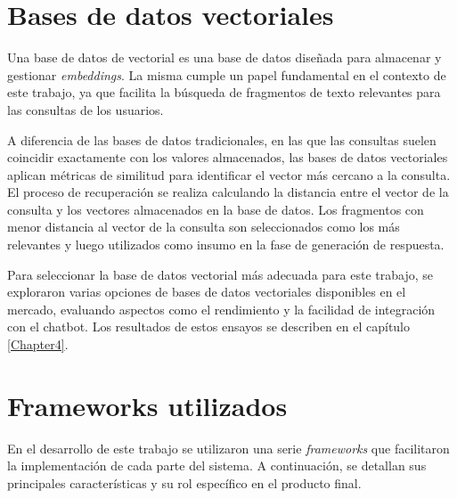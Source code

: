\section{Bases de datos vectoriales}

Una base de datos de vectorial es una base de datos diseñada para almacenar y gestionar \textit{embeddings}. La misma
cumple un papel fundamental en el contexto de este trabajo, ya que facilita la búsqueda de fragmentos de texto 
relevantes para las consultas de los usuarios.

A diferencia de las bases de datos tradicionales, en las que las consultas suelen coincidir exactamente con los valores almacenados, 
las bases de datos vectoriales aplican métricas de similitud para identificar el vector más cercano a la consulta. 
El proceso de recuperación se realiza calculando la distancia entre 
el vector de la consulta y los vectores almacenados en la base de datos. Los fragmentos con menor distancia al vector 
de la consulta son seleccionados como los más relevantes y luego utilizados como insumo en la fase de generación de respuesta. 

Para seleccionar la base de datos vectorial más adecuada para este trabajo, se exploraron varias opciones de bases de datos 
vectoriales disponibles en el mercado, evaluando aspectos como el rendimiento y la facilidad de integración con el chatbot. 
Los resultados de estos ensayos se describen en el capítulo \ref{Chapter4}.

\section{Frameworks utilizados}

En el desarrollo de este trabajo se utilizaron una serie \textit{frameworks} que facilitaron la implementación de 
cada parte del sistema. A continuación, se detallan sus principales características y su rol específico en el producto final.

